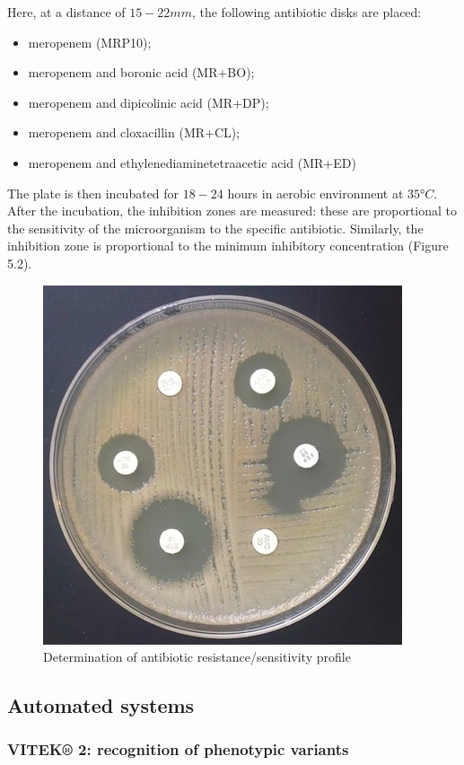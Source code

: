 \documentclass[11pt]{report}
\begin{document}
Here, at a distance of $15-22 mm$, the following antibiotic disks are placed:
\begin{itemize}
\item meropenem (MRP10);
\item meropenem and boronic acid (MR+BO);
\item meropenem and dipicolinic acid (MR+DP);
\item meropenem and cloxacillin (MR+CL);
\item meropenem and ethylenediaminetetraacetic acid (MR+ED)
\end{itemize}

The plate is then incubated for $18-24$ hours in aerobic environment at $35°C$.
After the incubation, the inhibition zones are measured: these are proportional to the sensitivity of the microorganism to the specific antibiotic. 
Similarly, the inhibition zone is proportional to the minimum inhibitory concentration (Figure 5.2).

\begin{figure}[htp]
\centering
\includegraphics[scale=0.93]{immagini gamalero/5disks.jpg}
\caption{Determination of antibiotic resistance/sensitivity profile}
\label{}
\end{figure}

\clearpage
\subsection{Automated systems}
\subsubsection{VITEK® 2: recognition of phenotypic variants}
\end{document}
